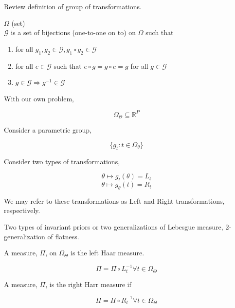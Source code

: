 \documentclass[11pt,fleqn]{book} %
\begin{document}
\begin{remark}
Review definition of group of transformations. 

$\Omega$ (set)\\

$\mathcal{G}$ is a set of bijections (one-to-one on to) on $\Omega$ such that 

\begin{enumerate}
	\item for all $g_1, g_2 \in \mathcal{G}, g_1 \circ g_2 \in \mathcal{G}$
	\item for all $e \in \mathcal{G}$ such that $e \circ g = g \circ e = g$ for all $g \in \mathcal{G}$
	\item $g \in \mathcal{G} \Rightarrow g^{-1} \in \mathcal{G}$
\end{enumerate}	
\end{remark}

With our own problem, 

$$\Omega_\Theta \subseteq \mathbb{R}^P $$

Consider a parametric group, 

		$$\{g_t : t \in \Omega_\theta \} $$

Consider two types of transformations, 

		$$\theta \mapsto g_t(\theta) = L_t$$
		$$\theta \mapsto g_\theta(t) = R_t$$

We may refer to these transformations as Left and Right transformations, respectively. 

Two types of invariant priors or two generalizations of Lebesgue measure, 2-generalization of flatness. 

\begin{definition}
	A measure, $\Pi$, on $\Omega_\Theta$ is the left Haar measure. 

			$$\Pi = \Pi \circ L^{-1}_t \forall t \in \Omega_\Theta $$

	A measure, $\Pi$, is the right Harr measure if 

			$$ \Pi = \Pi \circ R^{-1}_t \forall t \in \Omega_\Theta$$
\end{definition}
\end{document}
